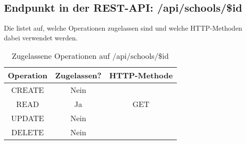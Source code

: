 \subsection{Endpunkt in der REST-API: /api/schools/\$id}
Die  listet auf, welche Operationen zugelassen sind und welche HTTP-Methoden dabei verwendet werden. 


\begin{table}[!htbp]
	\begin{tabular}{|c|c|c|}
		\hline
			\textbf{Operation} & \textbf{Zugelassen?} & \textbf{HTTP-Methode} \\ \hline
			CREATE & Nein & \\ \hline 
			READ & Ja & GET \\ \hline
			UPDATE & Nein & \\ \hline 
			DELETE & Nein & \\ \hline
	\end{tabular}

		\caption{Zugelassene Operationen auf /api/schools/\$id}
		\label{tab:end:rest:api:schools:id:meth}
\end{table}